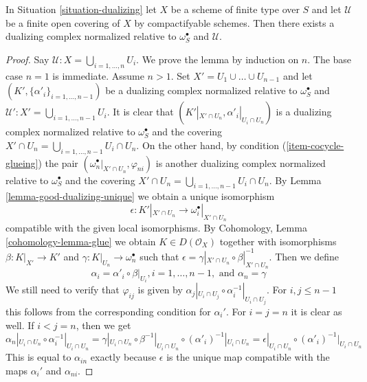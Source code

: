 \begin{lemma}
\label{lemma-existence-good-dualizing}
In Situation \ref{situation-dualizing} let $X$ be a scheme of finite type
over $S$ and let $\mathcal{U}$ be a finite open covering
of $X$ by compactifyable schemes. Then there exists
a dualizing complex normalized relative to $\omega_S^\bullet$ and
$\mathcal{U}$.
\end{lemma}

\begin{proof}
Say $\mathcal{U} : X = \bigcup_{i = 1, \ldots, n} U_i$.
We prove the lemma by induction on $n$. The base case $n = 1$ is immediate.
Assume $n > 1$. Set $X' = U_1 \cup \ldots \cup U_{n - 1}$
and let $(K', \{\alpha'_i\}_{i = 1, \ldots, n - 1})$
be a dualizing complex normalized relative to $\omega_S^\bullet$
and $\mathcal{U}' : X' = \bigcup_{i = 1, \ldots, n - 1} U_i$.
It is clear that $(K'|_{X' \cap U_n}, \alpha'_i|_{U_i \cap U_n})$
is a dualizing complex normalized relative to $\omega_S^\bullet$
and the covering
$X' \cap U_n = \bigcup_{i = 1, \ldots, n - 1} U_i \cap U_n$.
On the other hand, by condition (\ref{item-cocycle-glueing}) the pair
$(\omega_n^\bullet|_{X' \cap U_n}, \varphi_{ni})$
is another dualizing complex normalized relative to $\omega_S^\bullet$
and the covering
$X' \cap U_n = \bigcup_{i = 1, \ldots, n - 1} U_i \cap U_n$.
By Lemma \ref{lemma-good-dualizing-unique} we obtain a unique isomorphism
$$
\epsilon : K'|_{X' \cap U_n} \longrightarrow \omega_i^\bullet|_{X' \cap U_n}
$$
compatible with the given local isomorphisms.
By Cohomology, Lemma \ref{cohomology-lemma-glue}
we obtain $K \in D(\mathcal{O}_X)$ together with
isomorphisms $\beta : K|_{X'} \to K'$ and
$\gamma : K|_{U_n} \to \omega_n^\bullet$ such that
$\epsilon = \gamma|_{X'\cap U_n} \circ \beta|_{X' \cap U_n}^{-1}$.
Then we define
$$
\alpha_i = \alpha'_i \circ \beta|_{U_i}, i = 1, \ldots, n - 1,
\text{ and }
\alpha_n = \gamma
$$
We still need to verify that $\varphi_{ij}$ is given by
$\alpha_j|_{U_i \cap U_j} \circ \alpha_i^{-1}|_{U_i \cap U_j}$.
For $i, j \leq n - 1$ this follows from the corresponding
condition for $\alpha_i'$. For $i = j = n$ it is clear as well.
If $i < j = n$, then we get
$$
\alpha_n|_{U_i \cap U_n} \circ \alpha_i^{-1}|_{U_i \cap U_n} =
\gamma|_{U_i \cap U_n} \circ \beta^{-1}|_{U_i \cap U_n}
\circ (\alpha'_i)^{-1}|_{U_i \cap U_n} =
\epsilon|_{U_i \cap U_n} \circ (\alpha'_i)^{-1}|_{U_i \cap U_n}
$$
This is equal to $\alpha_{in}$ exactly because $\epsilon$
is the unique map compatible with the maps
$\alpha_i'$ and $\alpha_{ni}$.
\end{proof}

